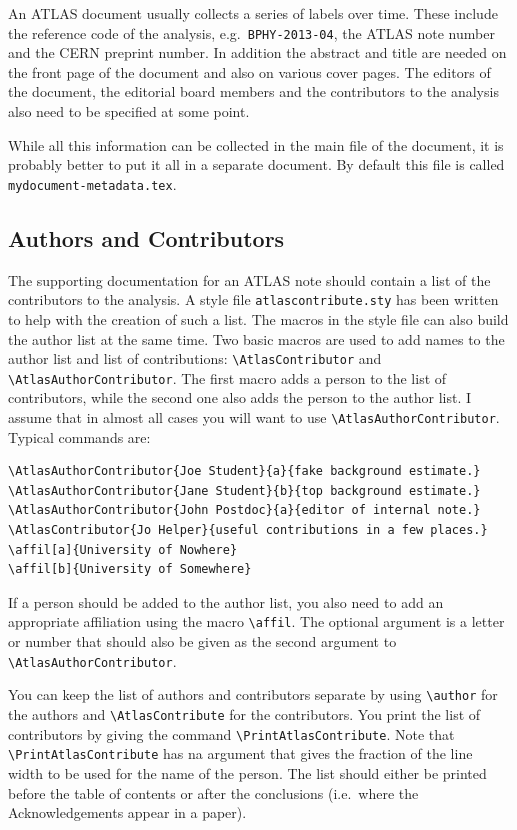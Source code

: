 \documentclass[UKenglish]{latex/atlasdoc}
\newcommand{\Macro}[1]{\texttt{\textbackslash #1}\xspace}
\newcommand{\Package}[1]{\texttt{#1}\xspace}
\begin{document}
An ATLAS document usually collects a series of labels over time.
These include the reference code of the analysis, e.g.\ \texttt{BPHY-2013-04}, 
the ATLAS note number and the CERN preprint number.
In addition the abstract and title are needed on the front page of the document and also on various cover pages.
The editors of the document, the editorial board members and the contributors to the analysis
also need to be specified at some point.

While all this information can be collected in the main file of the document, 
it is probably better to put it all in a separate document.
By default this file is called \texttt{mydocument-metadata.tex}.


\subsection{Authors and Contributors}
\label{sec:contribute}

The supporting documentation for an ATLAS note should contain a list of the contributors to the analysis.
A style file \Package{atlascontribute.sty} has been written to help with the creation of such a list.
The macros in the style file can also build the author list at the same time.
Two basic macros are used to add names to the author list and list of contributions:
\Macro{AtlasContributor} and \Macro{AtlasAuthorContributor}. 
The first macro adds a person to the list of contributors, while the second one also adds the person
to the author list. I assume that in almost all cases you will want to use \Macro{AtlasAuthorContributor}.
Typical commands are:
\begin{verbatim}
\AtlasAuthorContributor{Joe Student}{a}{fake background estimate.}
\AtlasAuthorContributor{Jane Student}{b}{top background estimate.}
\AtlasAuthorContributor{John Postdoc}{a}{editor of internal note.}
\AtlasContributor{Jo Helper}{useful contributions in a few places.}
\affil[a]{University of Nowhere}
\affil[b]{University of Somewhere}
\end{verbatim}
If a person should be added to the author list, you also need to add an appropriate affiliation using the macro \Macro{affil}.
The optional argument is a letter or number that should also be given as the second argument to
\Macro{AtlasAuthorContributor}.

You can keep the list of authors and contributors separate
by using \Macro{author} for the authors and \Macro{AtlasContribute} for the contributors.
You print the list of contributors by giving the command \Macro{PrintAtlasContribute}.
Note that \Macro{PrintAtlasContribute} has na argument that gives the fraction of the line width
to be used for the name of the person.
The list should either be printed before the table of contents or after the conclusions
(i.e.\ where the Acknowledgements appear in a paper).
\end{document}
